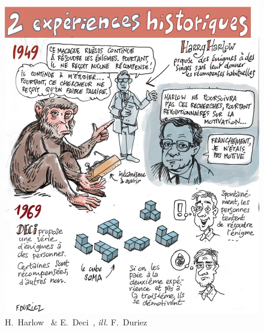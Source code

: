     \begin{figure}[!h]
    \begin{minipage}{0.475\linewidth}
        \centering
        \includegraphics[width=\linewidth]{Figures/Duriez-motiv1.jpg}
        \caption[Harry Harlow~ \& Edward Deci~]{H.~Harlow~ \& E.~Deci~, \textit{ill.} F.~Duriez~}
        \label{fig:motiv1}
    \end{minipage}
    \hfill
    \begin{minipage}{0.475\linewidth}
        \centering

\end{minipage}
\end{figure}
